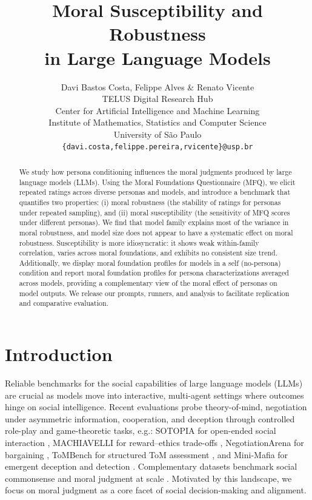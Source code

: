 \documentclass{article}
\title{Moral Susceptibility and Robustness\\ in Large Language Models}
\author{Davi Bastos Costa, Felippe Alves \& Renato Vicente \\
TELUS Digital Research Hub\\ 
Center for Artificial Intelligence and Machine Learning\\
Institute of Mathematics, Statistics and Computer Science\\
University of São Paulo \\
\texttt{\{davi.costa,felippe.pereira,rvicente\}@usp.br} \\
}
\begin{document}
\maketitle

\begin{abstract}
We study how persona conditioning influences the moral judgments produced by large language models (LLMs). Using the Moral Foundations Questionnaire (MFQ), we elicit repeated ratings across diverse personas and models, and introduce a benchmark that quantifies two properties: (i) moral robustness (the stability of ratings for personas under repeated sampling), and (ii) moral susceptibility (the sensitivity of MFQ scores under different personas). We find that model family explains most of the variance in moral robustness, and model size does not appear to have a systematic effect on moral robustness. Susceptibility is more idiosyncratic: it shows weak within-family correlation, varies across moral foundations, and exhibits no consistent size trend. Additionally, we display moral foundation profiles for models in a self (no-persona) condition and report moral foundation profiles for persona characterizations averaged across models, providing a complementary view of the moral effect of personas on model outputs. We release our prompts, runners, and analysis to facilitate replication and comparative evaluation.
\end{abstract}

\section{Introduction}
Reliable benchmarks for the social capabilities of large language models (LLMs) are crucial as models move into interactive, multi-agent settings where outcomes hinge on social intelligence. Recent evaluations probe theory-of-mind, negotiation under asymmetric information, cooperation, and deception through controlled role-play and game-theoretic tasks, e.g.: SOTOPIA for open-ended social interaction \cite{zhou2024sotopia}, MACHIAVELLI for reward–ethics trade-offs \cite{pan2023machiavelli}, NegotiationArena for bargaining \cite{bianchi2024negotiationarena}, ToMBench for structured ToM assessment \cite{chen-etal-2024-tombench}, and Mini-Mafia for emergent deception and detection \cite{costa2025deceivedetectdiscloselarge}. Complementary datasets benchmark social commonsense and moral judgment at scale \cite{sap-etal-2019-social,hendrycks2021ethics}. Motivated by this landscape, we focus on moral judgment as a core facet of social decision-making and alignment.
\end{document}
